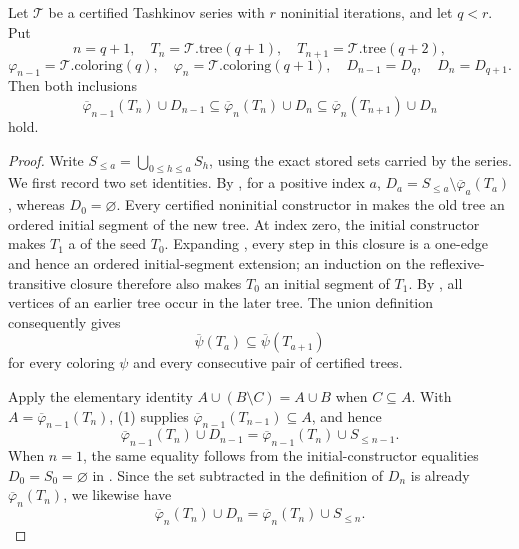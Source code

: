 \begin{lemma}
Let \(\mathcal T\) be a certified Tashkinov series with \(r\) noninitial
iterations, and let \(q<r\).  Put
\[
 n=q+1,\quad T_n=\mathcal T.\mathrm{tree}(q+1),\quad
 T_{n+1}=\mathcal T.\mathrm{tree}(q+2),
\]
\[
 \varphi_{n-1}=\mathcal T.\mathrm{coloring}(q),\quad
 \varphi_n=\mathcal T.\mathrm{coloring}(q+1),\quad
 D_{n-1}=D_q,\quad D_n=D_{q+1}.
\]
Then both inclusions
\[
 \overline\varphi_{n-1}(T_n)\cup D_{n-1}
 \subseteq \overline\varphi_n(T_n)\cup D_n
 \subseteq \overline\varphi_n(T_{n+1})\cup D_n
\]
hold.
\end{lemma}
\begin{proof}
Write \(S_{\leq a}=\bigcup_{0\leq h\leq a}S_h\), using the exact
stored sets carried by the series.  We first record two set identities.
By , for a positive index \(a\),
\(D_a=S_{\leq a}\setminus\overline\varphi_a(T_a)\), whereas
\(D_0=\varnothing\).  Every certified noninitial constructor in
 makes the old tree an ordered initial
segment of the new tree.  At index zero, the initial constructor makes
\(T_1\) a  of the seed \(T_0\).  Expanding
, every step in this closure is a
one-edge  and hence an ordered
initial-segment extension; an
induction on the reflexive-transitive closure therefore also makes
\(T_0\) an initial segment of \(T_1\).  By
, all vertices of an earlier tree
occur in the later tree.  The union definition
 consequently gives
\[
 \overline\psi(T_a)\subseteq\overline\psi(T_{a+1})                 \tag{1}
\]
for every coloring \(\psi\) and every consecutive pair of certified
trees.

Apply the elementary identity
\(A\cup(B\setminus C)=A\cup B\) when \(C\subseteq A\).  With
\(A=\overline\varphi_{n-1}(T_n)\), (1) supplies
\(\overline\varphi_{n-1}(T_{n-1})\subseteq A\), and hence
\[
 \overline\varphi_{n-1}(T_n)\cup D_{n-1}
 =\overline\varphi_{n-1}(T_n)\cup S_{\leq n-1}.                  \tag{2}
\]
When \(n=1\), the same equality follows from the initial-constructor
equalities \(D_0=S_0=\varnothing\) in
.  Since the set subtracted in the definition
of \(D_n\) is already \(\overline\varphi_n(T_n)\), we likewise have
\[
 \overline\varphi_n(T_n)\cup D_n
 =\overline\varphi_n(T_n)\cup S_{\leq n}.                        \tag{3}
\]


\end{proof}

